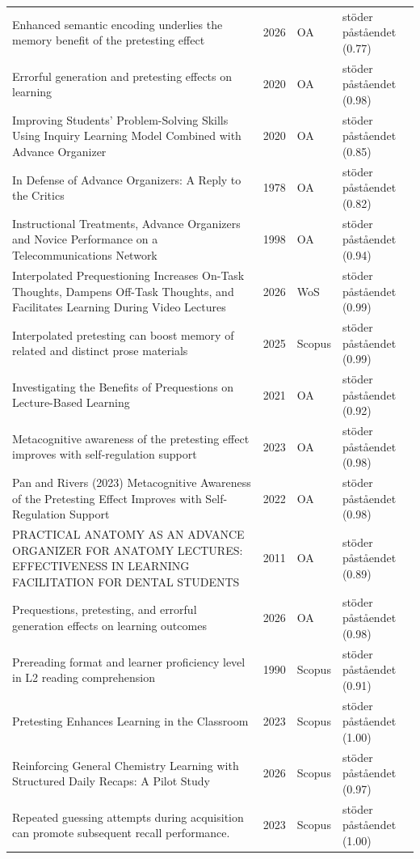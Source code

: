 \begin{longtable}{@{}%
  >{\raggedright\arraybackslash}p{}c%
  >{\raggedright\arraybackslash}p{}%
  >{\raggedright\arraybackslash}p{}@{}}
Enhanced semantic encoding underlies the memory benefit of the pretesting effect & 2026 & OA & stöder påståendet (0.77) \\
Errorful generation and pretesting effects on learning & 2020 & OA & stöder påståendet (0.98) \\
Improving Students' Problem-Solving Skills Using Inquiry Learning Model Combined with Advance Organizer & 2020 & OA & stöder påståendet (0.85) \\
In Defense of Advance Organizers: A Reply to the Critics & 1978 & OA & stöder påståendet (0.82) \\
Instructional Treatments, Advance Organizers and Novice Performance on a Telecommunications Network & 1998 & OA & stöder påståendet (0.94) \\
Interpolated Prequestioning Increases On-Task Thoughts, Dampens Off-Task Thoughts, and Facilitates Learning During Video Lectures & 2026 & WoS & stöder påståendet (0.99) \\
Interpolated pretesting can boost memory of related and distinct prose materials & 2025 & Scopus & stöder påståendet (0.99) \\
Investigating the Benefits of Prequestions on Lecture-Based Learning & 2021 & OA & stöder påståendet (0.92) \\
Metacognitive awareness of the pretesting effect improves with self-regulation support & 2023 & OA & stöder påståendet (0.98) \\
Pan and Rivers (2023) Metacognitive Awareness of the Pretesting Effect Improves with Self-Regulation Support & 2022 & OA & stöder påståendet (0.98) \\
PRACTICAL ANATOMY AS AN ADVANCE ORGANIZER FOR ANATOMY LECTURES: EFFECTIVENESS IN LEARNING FACILITATION FOR DENTAL STUDENTS & 2011 & OA & stöder påståendet (0.89) \\
Prequestions, pretesting, and errorful generation effects on learning outcomes & 2026 & OA & stöder påståendet (0.98) \\
Prereading format and learner proficiency level in L2 reading comprehension & 1990 & Scopus & stöder påståendet (0.91) \\
Pretesting Enhances Learning in the Classroom & 2023 & Scopus & stöder påståendet (1.00) \\
Reinforcing General Chemistry Learning with Structured Daily Recaps: A Pilot Study & 2026 & Scopus & stöder påståendet (0.97) \\
Repeated guessing attempts during acquisition can promote subsequent recall performance. & 2023 & Scopus & stöder påståendet (1.00) \\

\end{longtable}
